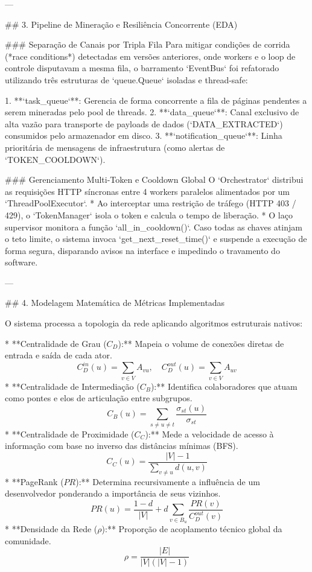 ---

## 3. Pipeline de Mineração e Resiliência Concorrente (EDA)

### Separação de Canais por Tripla Fila
Para mitigar condições de corrida (*race conditions*) detectadas em versões anteriores, onde workers e o loop de controle disputavam a mesma fila, o barramento `EventBus` foi refatorado utilizando três estruturas de `queue.Queue` isoladas e thread-safe:

1.  **`task_queue`**: Gerencia de forma concorrente a fila de páginas pendentes a serem mineradas pelo pool de threads.
2.  **`data_queue`**: Canal exclusivo de alta vazão para transporte de payloads de dados (`DATA_EXTRACTED`) consumidos pelo armazenador em disco.
3.  **`notification_queue`**: Linha prioritária de mensagens de infraestrutura (como alertas de `TOKEN_COOLDOWN`).

### Gerenciamento Multi-Token e Cooldown Global
O `Orchestrator` distribui as requisições HTTP síncronas entre 4 workers paralelos alimentados por um `ThreadPoolExecutor`. 
* Ao interceptar uma restrição de tráfego (HTTP 403 / 429), o `TokenManager` isola o token e calcula o tempo de liberação.
* O laço supervisor monitora a função `all_in_cooldown()`. Caso todas as chaves atinjam o teto limite, o sistema invoca `get_next\_reset\_time()` e suspende a execução de forma segura, disparando avisos na interface e impedindo o travamento do software.

---

## 4. Modelagem Matemática de Métricas Implementadas

O sistema processa a topologia da rede aplicando algoritmos estruturais nativos:

* **Centralidade de Grau ($C_D$):** Mapeia o volume de conexões diretas de entrada e saída de cada ator.
    $$C_D^{in}(u) = \sum_{v \in V} A_{vu}, \quad C_D^{out}(u) = \sum_{v \in V} A_{uv}$$
* **Centralidade de Intermediação ($C_B$):** Identifica colaboradores que atuam como pontes e elos de articulação entre subgrupos.
    $$C_B(u) = \sum_{s \neq u \neq t} \frac{\sigma_{st}(u)}{\sigma_{st}}$$
* **Centralidade de Proximidade ($C_C$):** Mede a velocidade de acesso à informação com base no inverso das distâncias mínimas (BFS).
    $$C_C(u) = \frac{|V| - 1}{\sum_{v \neq u} d(u, v)}$$
* **PageRank ($PR$):** Determina recursivamente a influência de um desenvolvedor ponderando a importância de seus vizinhos.
    $$PR(u) = \frac{1-d}{|V|} + d \sum_{v \in B_u} \frac{PR(v)}{C_D^{out}(v)}$$
* **Densidade da Rede ($\rho$):** Proporção de acoplamento técnico global da comunidade.
    $$\rho = \frac{|E|}{|V|(|V| - 1)}$$

